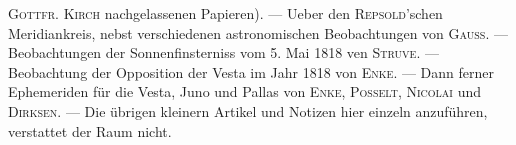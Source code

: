 \textsc{Gottfr. Kirch} nachgelassenen Papieren). --- Ueber den \textsc{Repsold}'schen Meridiankreis, nebst verschiedenen astronomischen Beobachtungen von \textsc{Gauss}. --- Beobachtungen der Sonnenfinsterniss vom 5. Mai 1818 ven \textsc{Struve}. --- Beobachtung der Opposition der Vesta im Jahr 1818 von \textsc{Enke}. --- Dann ferner Ephemeriden für die Vesta, Juno und Pallas von \textsc{Enke}, \textsc{Posselt}, \textsc{Nicolai} und \textsc{Dirksen}. --- Die übrigen kleinern Artikel und Notizen hier einzeln anzuführen, verstattet der Raum nicht.
